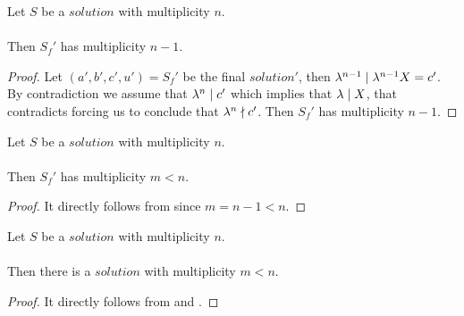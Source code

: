 \begin{lemma}
    \label{lmm:Solution1_final_multiplicity}
    \leanok
    Let $S$ be a $solution$ with multiplicity $n$.\\\\
    Then $S_f'$ has multiplicity $n-1$.
\end{lemma}
\begin{proof}
    \leanok
    Let $(a',b',c',u') = S_f'$ be the final $solution'$, then
    $\lambda^{n-1} \mid \lambda^{n-1} X = c'$.
    By contradiction we assume that $\lambda^n \mid c'$ which implies that $\lambda \mid X$,
    that contradicts  forcing us to conclude
    that $\lambda^{n} \nmid c'$. Then $S_f'$ has multiplicity $n-1$.
\end{proof}

\begin{lemma}
    \label{lmm:Solution1_final_multiplicity_lt}
    \leanok
    Let $S$ be a $solution$ with multiplicity $n$.\\\\
    Then $S_f'$ has multiplicity $m<n$.
\end{lemma}
\begin{proof}
    \leanok
    It directly follows from  since $m = n-1 < n$.
\end{proof}

\begin{theorem}
    \label{lmm:exists_Solution_multiplicity_lt}
    \leanok
    Let $S$ be a $solution$ with multiplicity $n$.\\\\
    Then there is a $solution$ with multiplicity $m<n$.
\end{theorem}
\begin{proof}
    \leanok
    It directly follows from  and
    .
\end{proof}

